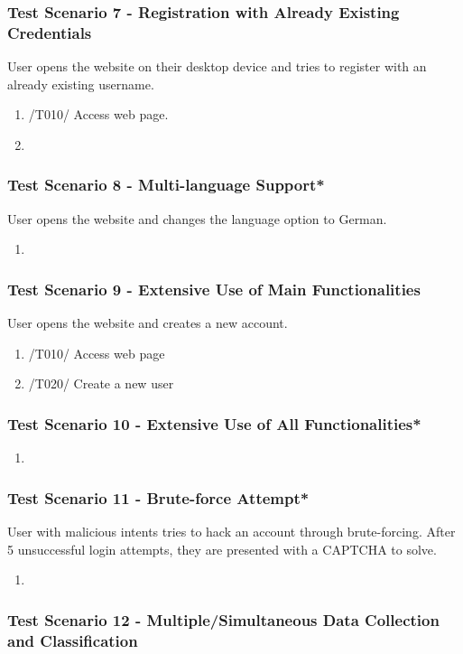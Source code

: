 \subsubsection{Test Scenario 7 - Registration with Already Existing Credentials}
User opens the website on their desktop device and tries to register with an already existing username.
\begin{enumerate}
    \item /T010/ Access web page.
    \item 
\end{enumerate}
\subsubsection{Test Scenario 8 - Multi-language Support*}
User opens the website and changes the language option to German. 
\begin{enumerate}
    \item 
\end{enumerate}
\subsubsection{Test Scenario 9 - Extensive Use of Main Functionalities}
User opens the website and creates a new account. 
\begin{enumerate}
    \item /T010/ Access web page
    \item /T020/ Create a new user
\end{enumerate}
\subsubsection{Test Scenario 10 - Extensive Use of All Functionalities*}

\begin{enumerate}
    \item 
\end{enumerate}
\subsubsection{Test Scenario 11 - Brute-force Attempt*}
User with malicious intents tries to hack an account through brute-forcing. After 5 unsuccessful login attempts, they are presented with a CAPTCHA to solve.
\begin{enumerate}
    \item 
\end{enumerate}
\subsubsection{Test Scenario 12 - Multiple/Simultaneous Data Collection and Classification}
